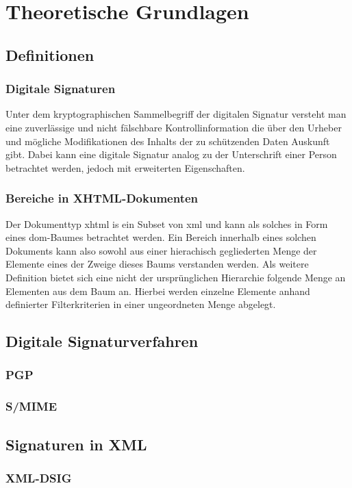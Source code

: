 
\chapter{Theoretische Grundlagen}
\label{chp:TheoretischeGrundlagen}

\section{Definitionen}

\subsection{Digitale Signaturen}
Unter dem kryptographischen Sammelbegriff der digitalen Signatur versteht man eine zuverlässige und nicht fälschbare Kontrollinformation die über den Urheber
und mögliche Modifikationen des Inhalts der zu schützenden Daten Auskunft gibt\cite[S. 28 ff]{kits}. Dabei kann eine digitale Signatur analog zu der Unterschrift
einer Person betrachtet werden\cite[S. 4]{esig:bsi}, jedoch mit erweiterten Eigenschaften.

\subsection{Bereiche in XHTML-Dokumenten}
Der Dokumenttyp \gls{xhtml} is ein Subset von \gls{xml}\cite{xhtml:w3c}\cite[S. 500 ff]{xhtml:oreilly} und kann als solches in Form eines \gls{dom}-Baumes betrachtet werden. Ein Bereich innerhalb eines
solchen Dokuments kann also sowohl aus einer hierachisch gegliederten Menge der Elemente eines der Zweige dieses Baums verstanden werden. Als weitere Definition
bietet sich eine nicht der ursprünglichen Hierarchie folgende Menge an Elementen aus dem Baum an. Hierbei werden einzelne Elemente anhand definierter
Filterkriterien in einer ungeordneten Menge abgelegt.


\section{Digitale Signaturverfahren}
\label{sec:thg:dsv}


\subsection{PGP}
\label{sec:thg:dsv:pgp}

\subsection{S/MIME}
\label{sec:thg:dsv:smime}


\section{Signaturen in XML}
\label{sec:thg:xml}


\subsection{XML-DSIG}
\label{sec:thg:xml:dsig}
